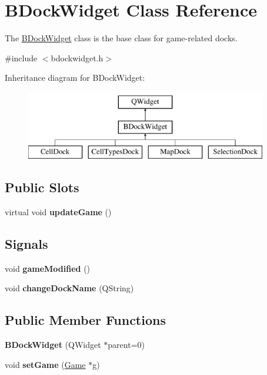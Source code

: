 \hypertarget{class_b_dock_widget}{}\section{B\+Dock\+Widget Class Reference}
\label{class_b_dock_widget}


The \hyperlink{class_b_dock_widget}{B\+Dock\+Widget} class is the base class for game-\/related docks.  




{\ttfamily \#include $<$bdockwidget.\+h$>$}

Inheritance diagram for B\+Dock\+Widget\+:\begin{figure}[H]
\begin{center}
\leavevmode
\includegraphics[height=3.000000cm]{class_b_dock_widget}
\end{center}
\end{figure}
\subsection*{Public Slots}
\begin{DoxyCompactItemize}
\item 
\hypertarget{class_b_dock_widget_af5b0bf4f6ccb10d3a6dfb2793dc30fc0}{}\label{class_b_dock_widget_af5b0bf4f6ccb10d3a6dfb2793dc30fc0} 
virtual void {\bfseries update\+Game} ()
\end{DoxyCompactItemize}
\subsection*{Signals}
\begin{DoxyCompactItemize}
\item 
\hypertarget{class_b_dock_widget_aac0c798372f3400d56e974ccbf4b6a2d}{}\label{class_b_dock_widget_aac0c798372f3400d56e974ccbf4b6a2d} 
void {\bfseries game\+Modified} ()
\item 
\hypertarget{class_b_dock_widget_a52d21551cb5aaa800969953d83d5799a}{}\label{class_b_dock_widget_a52d21551cb5aaa800969953d83d5799a} 
void {\bfseries change\+Dock\+Name} (Q\+String)
\end{DoxyCompactItemize}
\subsection*{Public Member Functions}
\begin{DoxyCompactItemize}
\item 
\hypertarget{class_b_dock_widget_ac054be8dfe8c967910190cc31689a2d0}{}\label{class_b_dock_widget_ac054be8dfe8c967910190cc31689a2d0} 
{\bfseries B\+Dock\+Widget} (Q\+Widget $\ast$parent=0)
\item 
\hypertarget{class_b_dock_widget_a47e19ff81c8dbe1fbb6f528bec7bdc2f}{}\label{class_b_dock_widget_a47e19ff81c8dbe1fbb6f528bec7bdc2f} 
void {\bfseries set\+Game} (\hyperlink{class_game}{Game} $\ast$g)
\end{DoxyCompactItemize}

